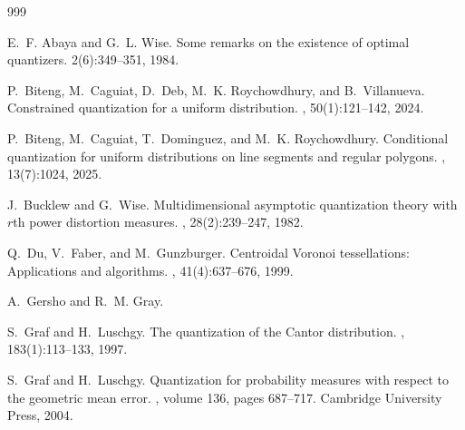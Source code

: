 \documentclass[12pt, reqno]{amsart}
\theoremstyle{plain}
\theoremstyle{definition}
\begin{document}


\begin{thebibliography}{999}



E.~F. Abaya and G.~L. Wise.
\newblock Some remarks on the existence of optimal quantizers.
 2(6):349--351, 1984.

P.~Biteng, M.~Caguiat, D.~Deb, M.~K. Roychowdhury, and B.~Villanueva.
\newblock Constrained quantization for a uniform distribution.
, 50(1):121--142, 2024.

P.~Biteng, M.~Caguiat, T.~Dominguez, and M.~K. Roychowdhury.
\newblock Conditional quantization for uniform distributions on line segments
  and regular polygons.
, 13(7):1024, 2025.

J.~Bucklew and G.~Wise.
\newblock Multidimensional asymptotic quantization theory with $r$th power
  distortion measures.
, 28(2):239--247, 1982.


Q.~Du, V.~Faber, and M.~Gunzburger.
\newblock Centroidal {V}oronoi tessellations: Applications and algorithms.
, 41(4):637--676, 1999.

A.~Gersho and R.~M. Gray.

S.~Graf and H.~Luschgy.
\newblock The quantization of the {C}antor distribution.
, 183(1):113--133, 1997.

S.~Graf and H.~Luschgy.
\newblock Quantization for probability measures with respect to the geometric
  mean error.
, volume 136, pages 687--717. Cambridge University Press, 2004.


\end{thebibliography}
\end{document}
